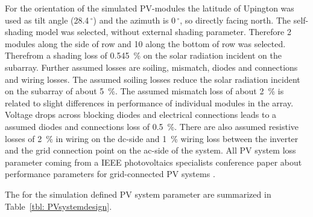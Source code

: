 For the orientation of the simulated PV-modules the latitude of Upington was used as tilt angle (28.4$\,^{\circ}$) and the azimuth is 0$\,^{\circ}$, so directly facing north. The self-shading model was selected, without external shading parameter. Therefore 2 modules along the side of row and 10 along the bottom of row was selected. Therefrom a shading loss of \SI{0.545}{\percent} on the solar radiation incident on the subarray. Further assumed losses are soiling, mismatch, diodes and connections and wiring losses. The assumed soiling losses reduce the solar radiation incident on the subarray of about \SI{5}{\percent}. The assumed mismatch loss of about \SI{2}{\percent} is related to slight differences in performance of individual modules in the array. Voltage drops across blocking diodes and electrical connections leads to a assumed diodes and connections loss of \SI{0.5}{\percent}. There are also assumed resistive losses of 2~\% in wiring on the dc-side and \SI{1}{\percent} wiring loss between the inverter and the grid connection point on the ac-side of the system. All PV system loss parameter coming from a IEEE photovoltaics specialists conference paper about performance parameters for grid-connected PV systems \cite{Marion2005}.

The for the simulation defined PV system parameter are summarized in Table~\ref{tbl: PVsystemdesign}.

